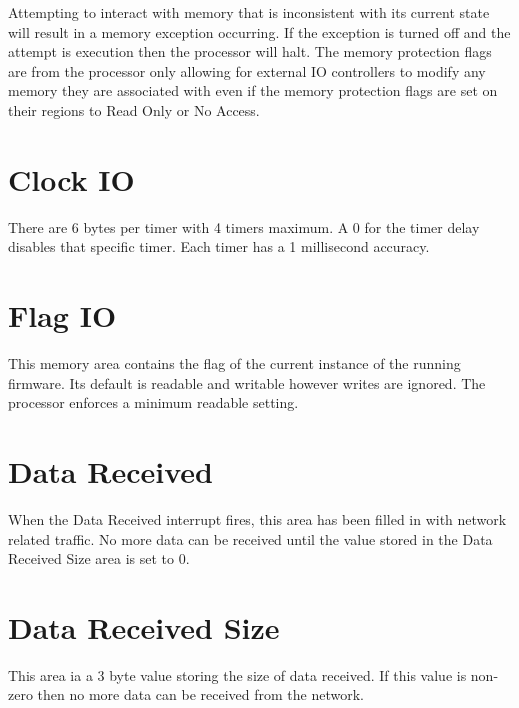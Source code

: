 


Attempting to interact with memory that is inconsistent with its current state will result in a memory exception occurring. If the exception is turned off and the attempt is execution then the processor will halt. The memory protection flags are from the processor only allowing for external IO controllers to modify any memory they are associated with even if the memory protection flags are set on their regions to Read Only or No Access.




\section{Clock IO}

There are 6 bytes per timer with 4 timers maximum. A 0 for the timer delay disables that specific timer. Each timer has a 1 millisecond accuracy.








\section{Flag IO}

This memory area contains the flag of the current instance of the running firmware. Its default is readable and writable however writes are ignored. The processor enforces a minimum readable setting.




\section{Data Received}

When the Data Received interrupt fires, this area has been filled in with network related traffic. No more data can be received until the value stored in the Data Received Size area is set to 0.




\section{Data Received Size}

This area ia a 3 byte value storing the size of data received. If this value is non-zero then no more data can be received from the network.




